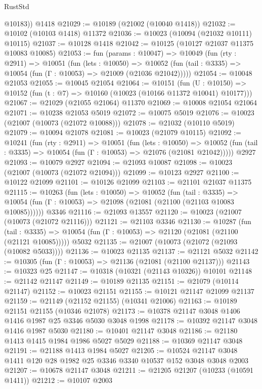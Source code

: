 \begin{lexlean}{RustStd}
\begin{coremodule}
        @10183))
    @1418
@21029 := @10189 (@21002 (@10040 @1418))
@21032 := @10102 (@10103 @1418) @11372
@21036 := @10023 (@10094 (@21032 @10111) @10115)
@21037 := @10128 @1418
@21042 := @10125 (@10127 @21037 @11375 @10083 @10085)
@21053 := fun (params : @10047) =>
  @10049
    (fun (rty : @2911) =>
    @10051
      (fun (lets : @10050) =>
      @10052 (fun (tail : @3335) => @10054 (fun (Γ : @10053) => @21009 (@21036 @21042)))))
@21054 := @10048 @21053
@21055 := @10045 @21054
@21064 := @10151
    (fun (U : @10150) => @10152 (fun (t : @7) => @10160 (@10023 (@10166 @11372 @10041) @10177)))
@21067 := @21029 (@21055 @21064) @11370
@21069 := @10008 @21054 @21064
@21071 := @10238 @21053 @5019
@21072 := @10075 @5019
@21076 := @10023 (@21007 (@10073 (@21072 @10088)))
@21078 := @21032 (@10110 @5019)
@21079 := @10094 @21078
@21081 := @10023 (@21079 @10115)
@21092 := @10241
    (fun (rty : @2911) =>
    @10051
      (fun (lets : @10050) =>
      @10052 (fun (tail : @3335) => @10054 (fun (Γ : @10053) => @21076 (@21081 @21042)))))
    @2927
@21093 := @10079 @2927
@21094 := @21093 @10087
@21098 := @10023 (@21007 (@10073 (@21072 @21094)))
@21099 := @10123 @2927
@21100 := @10122 @21099
@21101 := @10126 @21099
@21103 := @21101 @21037 @11375
@21115 := @10263
    (fun (lets : @10050) =>
    @10052
      (fun (tail : @3335) =>
      @10054 (fun (Γ : @10053) => @21098 (@21081 (@21100 (@21103 @10083 @10085))))))
    @3346
@21116 := @21093 @13557
@21120 := @10023 (@21007 (@10073 (@21072 @21116)))
@21121 := @21103 @3346
@21130 := @10287
    (fun (tail : @3335) => @10054 (fun (Γ : @10053) => @21120 (@21081 (@21100 (@21121 @10085)))))
    @5032
@21135 := @21007 (@10073 (@21072 (@21093 (@10082 @5033))))
@21136 := @10023 @21135
@21137 := @21121 @5032
@21142 := @10305 (fun (Γ : @10053) => @21136 (@21081 (@21100 @21137)))
@21143 := @10323 @25
@21147 := @10318 (@10321 (@21143 @10326)) @10101
@21148 := @21142 @21147
@21149 := @10189 @21135
@21151 := @21079 (@10114 @21147)
@21152 := @10023 @21151
@21155 := @10121 @21147 @21099 @21137
@21159 := @21149 (@21152 @21155) (@10341 @21006)
@21163 := @10189 @21151 @21155 (@10346 @21078)
@21173 := @10378 @21147 @3048 @1406 @1416 @1987 @25 @3346 @5030 @3048 @1998
@21178 := @10392 @21147 @3048 @1416 @1987 @5030
@21180 := @10401 @21147 @3048
@21186 := @21180 @1413 @1415 @1984 @1986 @5027 @5029
@21188 := @10369 @21147 @3048
@21191 := @21188 @1413 @1984 @5027
@21205 := @10524 @21147 @3048 @1411 @120 @28 @1982 @25 @3346 @3340 @10537 @152 @3048 @3048 @2003
@21207 := @10678 @21147 @3048
@21211 := @21205 @21207 (@10233 (@10591 @1411))
@21212 := @10107 @2003

\end{coremodule}
\end{lexlean}
